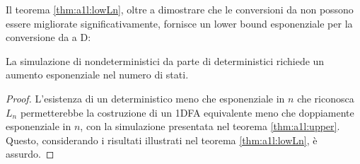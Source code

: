 Il teorema \ref{thm:a1l:lowLn}, oltre a dimostrare che le conversioni da  non possono essere migliorate significativamente, fornisce un lower bound esponenziale per la conversione da  a D:
\begin{corol}\label{cor:a1l:LAtoDLA}
	La simulazione di  nondeterministici da parte di  deterministici richiede un aumento esponenziale nel numero di stati.
\end{corol}
\begin{proof}
	L'esistenza di un  deterministico meno che esponenziale in $n$ che riconosca $L_n$ permetterebbe la costruzione di un 1DFA equivalente meno che doppiamente esponenziale in $n$, con la simulazione presentata nel teorema \ref{thm:a1l:upper}. Questo, considerando i risultati illustrati nel teorema \ref{thm:a1l:lowLn}, è assurdo.
\end{proof}

